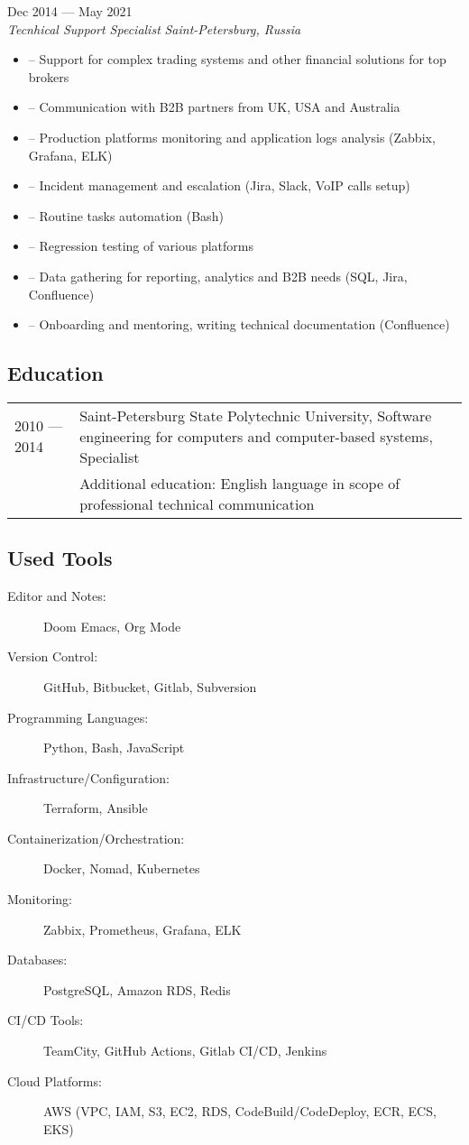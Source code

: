 \documentclass[10pt]{report}
\newenvironment{JobDescription}[5]{
    \vspace{ #5 }
    \flushleft
    {\bf #1 } \hfill { #2 }
    \\
    {\em #3 } \hfill {\em #4 }
    \begin{itemize}
} {
    \end{itemize}
}
\begin{document}
\begin{JobDescription}{}{Dec 2014 --- May 2021}{Tecnhical Support Specialist}{Saint-Petersburg, Russia}{0mm}
  \item[--] Support for complex trading systems and other financial solutions for top brokers
  \item[--] Communication with B2B partners from UK, USA and Australia
  \item[--] Production platforms monitoring and application logs analysis (Zabbix, Grafana, ELK)
  \item[--] Incident management and escalation (Jira, Slack, VoIP calls setup)
  \item[--] Routine tasks automation (Bash)
  \item[--] Regression testing of various platforms
  \item[--] Data gathering for reporting, analytics and B2B needs (SQL, Jira, Confluence)
  \item[--] Onboarding and mentoring, writing technical documentation (Confluence)
\end{JobDescription}

\goodbreak

\subsection*{Education}
\begin{table}[H]
  \begin{tabular}{@{}p{}p{}}
    2010 --- 2014 & Saint-Petersburg State Polytechnic University, Software engineering for computers and computer-based systems, Specialist \\
                  & Additional education: English language in scope of professional technical communication
  \end{tabular}
\end{table}

\goodbreak

\subsection*{Used Tools}
\begin{description}
  \item[Editor and Notes:]
        Doom Emacs, Org Mode
  \item[Version Control:]
        GitHub, Bitbucket, Gitlab, Subversion
  \item[Programming Languages:]
        Python, Bash, JavaScript
  \item[Infrastructure/Configuration:]
        Terraform, Ansible
  \item[Containerization/Orchestration:]
        Docker, Nomad, Kubernetes
  \item[Monitoring:]
        Zabbix, Prometheus, Grafana, ELK
  \item[Databases:]
        PostgreSQL, Amazon RDS, Redis
  \item[CI/CD Tools:]
        TeamCity, GitHub Actions, Gitlab CI/CD, Jenkins
  \item[Cloud Platforms:]
        AWS (VPC, IAM, S3, EC2, RDS, CodeBuild/CodeDeploy, ECR, ECS, EKS)
\end{description}
\end{document}
